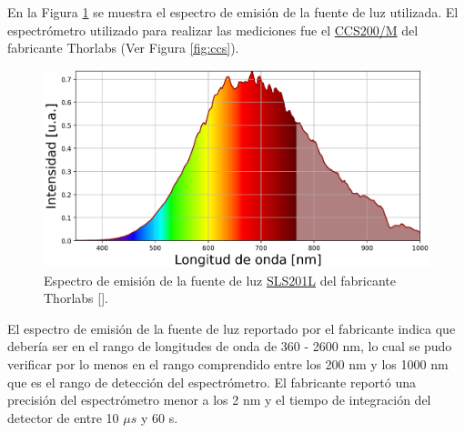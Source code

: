 En la Figura \ref{fig:espfth} se muestra el espectro de emisión de la fuente de luz utilizada.  El espectrómetro utilizado para realizar las mediciones fue el \href{https://www.thorlabs.com/thorproduct.cfm?partnumber=CCS200/M#ad-image-0}{CCS200/M} del fabricante Thorlabs (Ver Figura \ref{fig:ccs}).

\begin{figure}[H]
	\centering
	\includegraphics[scale=0.5]{Figs/microespectrometro/espfuentethorl.png}
	\caption{Espectro de emisión de la fuente de luz \href{https://www.thorlabs.com/newgrouppage9.cfm?objectgroup\_id=7269&pn=SLS201L/M}{SLS201L} del fabricante Thorlabs [\href{https://github.com/jrr1984/defects\_analysis/blob/master/light\_sources\_spectrum.py}{\faGithub}].}
	\label{fig:espfth}
\end{figure}

El espectro de emisión de la fuente de luz reportado por el fabricante indica que debería ser en el rango de longitudes de onda de 360 - 2600 nm, lo cual se pudo verificar por lo menos en el rango comprendido entre los 200 nm y los 1000 nm que es el rango de detección del espectrómetro. El fabricante reportó una precisión del espectrómetro menor a los 2 nm y el tiempo de integración del detector de entre 10 $\mu s$ y 60 s.


